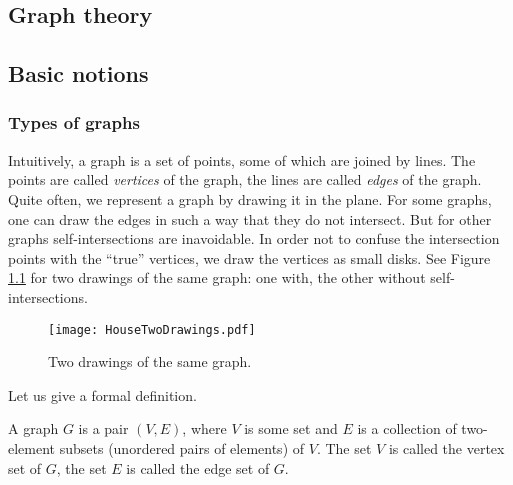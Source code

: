 \begin{page}

\chapter{Graph theory}
\section{Basic notions}
\subsection{Types of graphs}
Intuitively, a graph is a set of points, some of which are joined by lines.
The points are called \emph{vertices} of the graph, the lines are called \emph{edges} of the graph.
Quite often, we represent a graph by drawing it in the plane.
For some graphs, one can draw the edges in such a way that they do not intersect.
But for other graphs self-intersections are inavoidable.
In order not to confuse the intersection points with the ``true'' vertices, we draw the vertices as small disks.
See Figure \ref{fig:TwoDrawings} for two drawings of the same graph: one with, the other without self-intersections.

\begin{figure}[ht]
\begin{center}
\texttt{[image: HouseTwoDrawings.pdf]}
\end{center}
\caption{Two drawings of the same graph.}
\label{fig:TwoDrawings}
\end{figure}

Let us give a formal definition.

\end{page}

\begin{page}

\begin{dfn}
\label{dfn:Graph}
A graph $G$ is a pair $(V,E)$, where $V$ is some set and $E$ is a collection of two-element subsets (unordered pairs of elements) of $V$.
The set $V$ is called the vertex set of $G$, the set $E$ is called the edge set of $G$.
\end{dfn}

\end{page}

